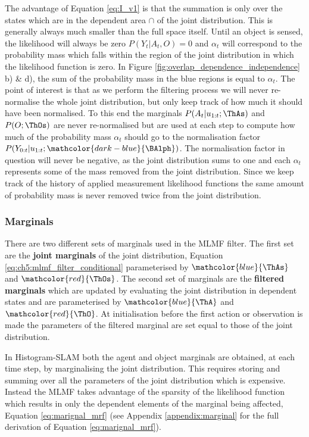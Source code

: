 The advantage of Equation \ref{eq:I_v1} is that the summation is only over the states which are in the dependent area $\cap$ of the joint 
distribution. This is generally always much smaller than the full space itself.
Until an object is sensed, the likelihood will always be zero $P(Y_t|A_t,O) = 0$ and $\alpha_t$ will correspond to the probability 
mass which falls within the region of the joint distribution in which the likelihood function is zero. In Figure 
\ref{fig:overlap_dependence_independence} b) \& d), the sum of the probability mass in the blue 
regions is equal to $\alpha_t$.
The point of interest is that as we perform the filtering process we will never re-normalise the whole joint distribution, but only keep 
track of how much it should have been normalised. To this end the marginals  $P(A_t|u_{1:t};\ThAs)$ and $P(O;\ThOs)$  are never re-normalised but are used
at each step to compute how much of the probability mass $\alpha_t$ should go to the normalisation factor $P(Y_{0:t}|u_{1:t};\mathcolor{dark-blue}{\BAlph})$. 
The normalisation factor in question will never be negative, as the joint distribution sums to one and each $\alpha_t$ represents some of the mass removed from the joint distribution. Since we 
keep track of the history of applied  measurement likelihood functions the same amount of probability mass is never removed twice
from the joint distribution.

\subsubsection{Marginals}

There are two different sets of marginals used in the MLMF filter. The first set are the \textbf{joint marginals} of the joint distribution, Equation \ref{eq:ch5:mlmf_filter_conditional}
parameterised by $\mathcolor{blue}{\ThAs}$ and $\mathcolor{red}{\ThOs}$. The second set of marginals are the \textbf{filtered marginals} which are updated by evaluating the joint distribution in dependent states and 
are parameterised by $\mathcolor{blue}{\ThA}$ and $\mathcolor{red}{\ThO}$. At initialisation before the first action or observation is made 
the parameters of the filtered marginal are set equal to those of the joint distribution.

In Histogram-SLAM both the agent and object marginals are obtained, at each time step, by marginalising the joint distribution.
This requires storing and summing over all the parameters of the joint distribution which is expensive.
Instead the MLMF takes advantage of the sparsity of the likelihood function which results in only the dependent elements of the marginal being affected, 
Equation \ref{eq:marignal_mrf} (see Appendix \ref{appendix:marginal} for the full derivation of Equation \ref{eq:marignal_mrf}). 

